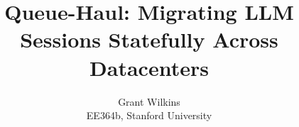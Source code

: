 \documentclass[letterpaper,twocolumn,10pt]{article}
\begin{document}
\date{}

\newcommand{\system}[0]{Queue-Haul\xspace}

\title{\Large \bf Queue-Haul: Migrating LLM Sessions Statefully Across Datacenters}



\author{
{\rm Grant Wilkins}\\
{\rm EE364b, Stanford University}
}

\maketitle











\end{document}
